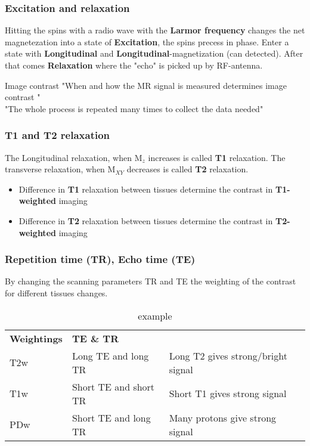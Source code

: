 		\subsubsection{Excitation and relaxation}
		Hitting the spins with a radio wave with the \textbf{Larmor frequency} changes the net magnetezation into a state of \textbf{Excitation}, the spins precess in phase. Enter a state with \textbf{Longitudinal} and \textbf{Longitudinal}-magnetization (can detected). After that comes \textbf{Relaxation} where the "echo" is picked up by RF-antenna.

			\begin{wbox}{Image contrast}
				"When and how the MR signal is measured determines image contrast " \\
				"The whole process is repeated many times to collect the data needed"	
			\end{wbox}

		\subsubsection{T1 and T2 relaxation}
		The Longitudinal relaxation, when M$_z$ increases is called \textbf{T1} relaxation. The transverse relaxation, when M$_{XY}$ decreases is called \textbf{T2} relaxation. 

			\begin{itemize}
				\item Difference in \textbf{T1} relaxation between tissues determine the contrast in \textbf{T1-weighted} imaging
				\item Difference in \textbf{T2} relaxation between tissues determine the contrast in \textbf{T2-weighted} imaging
			\end{itemize}	
		
		\subsubsection{Repetition time (TR), Echo time (TE)}
		By changing the scanning parameters TR and TE the weighting of the contrast for different tissues changes. 

			\begin{table}[ht!]
			\centering
			\begin{tabular}{lll}\hline
			 \textbf{Weightings}&  \textbf{TE \& TR}&   \\
			 T2w& Long TE and long TR &  Long T2 gives strong/bright signal\\
			 T1w&  Short TE and short TR & Short T1 gives strong signal \\
			 PDw&  Short TE and long TR  & Many protons give strong signal\\ \hline
			\end{tabular}
			\caption{example}
			\label{tab:tab1}
			\end{table}

